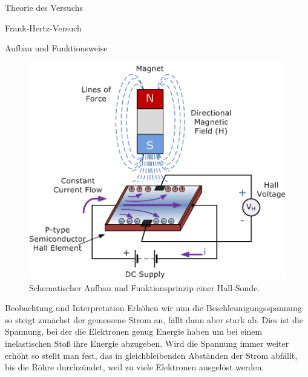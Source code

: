 \documentclass[pdftex, a4paper,11pt, twoside, ngerman]{report}
\begin{document}
\begin{chapter}{Theorie des Versuchs}
\begin{section}{Frank-Hertz-Versuch}
\begin{subsection}{Aufbau und Funktionsweise}
\begin{figure}[ht]
\begin{minipage}{0.48\textwidth}
            \caption{Schematischer Aufbau des Franck-Hertz-Versuches.
                \cite{bib:FH}}
            \label{fig:FHaufbau}
          \end{minipage}\quad
          \begin{minipage}{0.48\textwidth}
            \centering
            \includegraphics[width=\textwidth]{Figures/hall-sensor.png}
                \caption{Schematischer Aufbau und Funktionsprinzip einer
                    Hall-Sonde. \cite{bib:Hallsonde}}
            \label{fig:hallsensor}
          \end{minipage}
        \end{figure}
        
      \end{subsection}
      
      
      
      \begin{subsection}{Beobachtung und Interpretation}
        Erhöhen wir nun die Beschleunigungsspannung so steigt zunächst der
        gemessene Strom an, fällt dann aber stark ab. Dies ist die Spannung,
        bei der die Elektronen genug Energie haben um bei einem inelastischen
        Stoß ihre Energie abzugeben. Wird die Spannung immer weiter erhöht so
        stellt man fest, das in gleichbleibenden Abständen der Strom abfällt,
        bis die Röhre durchzündet, weil zu viele Elektronen ausgelöst werden. 
        

\end{subsection}
\end{section}
\end{chapter}
\end{document}
